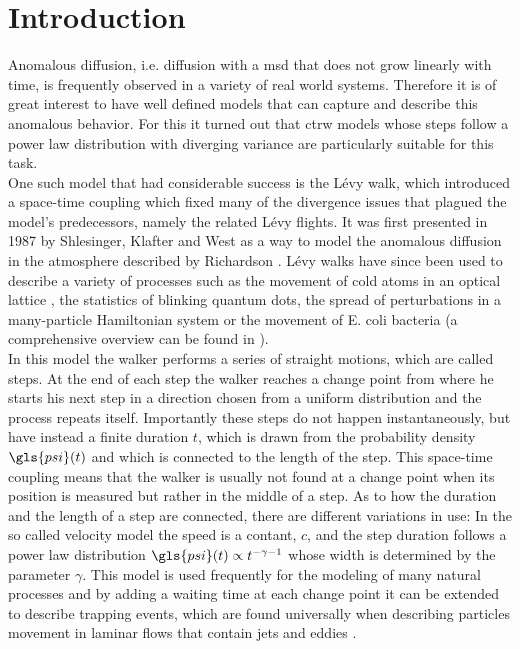 \chapter{Introduction}

Anomalous diffusion, i.e. diffusion with a \gls{msd} that does not grow linearly with time, is frequently observed in a variety of real world systems. Therefore it is of great interest to have well defined models that can capture and describe this anomalous behavior. For this it turned out that \gls{ctrw} models whose steps follow a power law distribution with diverging variance are particularly suitable for this task. \\

One such model that had considerable success is the L\'evy walk, which introduced a space-time coupling which fixed many of the divergence issues that plagued the model's predecessors, namely the related L\'evy flights. It was first presented in 1987 by Shlesinger, Klafter and West \cite{shlesinger1987} as a way to model the anomalous diffusion in the atmosphere described by Richardson \cite{richardson}. L\'evy walks have since been used to describe a variety of processes such as the movement of cold atoms in an optical lattice \cite{marksteiner1996},  the statistics of blinking quantum dots, the spread of perturbations in a many-particle Hamiltonian system \cite{zaburdaev2011perturbation} or the movement of E. coli bacteria \cite{korobkova2004} (a comprehensive overview can be found in \cite{lwreview}). \\

In this model the walker performs a series of straight motions, which are called steps. At the end of each step the walker reaches a change point from where he starts his next step in a direction chosen from a uniform distribution and the process repeats itself. Importantly these steps do not happen instantaneously, but have instead a finite duration $t$, which is drawn from the probability density $\gls{psi}(t)$ and which is connected to the length of the step. This space-time coupling means that the walker is usually not found at a change point  when its position is measured but rather in the middle of a step. As to how the duration and the length of a step are connected, there are different variations in use: In the so called velocity model the speed is a contant, $c$, and the step duration follows a power law distribution $\gls{psi}(t) \propto t^{-\gamma -1 }$ whose width is determined by the parameter $\gamma$. This model is used frequently for the modeling of many natural processes and by adding a waiting time at each change point it can be extended to describe trapping events, which are found universally when describing particles movement in laminar flows that contain jets and eddies \cite{solomon1993,solomon1994,poschke2017}.\\

